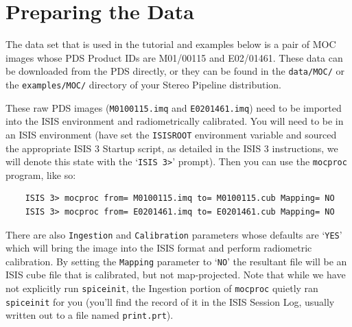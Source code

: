\section{Preparing the Data}

The data set that is used in the tutorial and examples below is a
pair of \ac{MOC} \citep{1992JGR....97.7699M,2001JGR...10623429M}
images whose \ac{PDS} Product IDs are M01/00115 and E02/01461.
These data can be downloaded from the PDS directly, or they can be
found in the \texttt{data/MOC/} or the \texttt{examples/MOC/}
directory of your Stereo Pipeline distribution.

These raw \ac{PDS} images (\texttt{M0100115.imq} and \texttt{E0201461.imq})
need to be imported into the \ac{ISIS} environment and radiometrically
calibrated.  You will need to be in an \ac{ISIS} environment (have
set the \texttt{ISISROOT} environment variable and sourced the
appropriate \ac{ISIS} 3 Startup script, as detailed in the \ac{ISIS}
3 instructions, we will denote this state with the `\texttt{ISIS
3>}' prompt).  Then you can use the \texttt{mocproc} program, like
so:

\begin{verbatim}
    ISIS 3> mocproc from= M0100115.imq to= M0100115.cub Mapping= NO
    ISIS 3> mocproc from= E0201461.imq to= E0201461.cub Mapping= NO
\end{verbatim}

There are also \texttt{Ingestion} and \texttt{Calibration} parameters
whose defaults are `\texttt{YES}' which will bring the image into
the \ac{ISIS} format and perform radiometric calibration.  By setting
the \texttt{Mapping} parameter to `\texttt{NO}' the resultant file
will be an \ac{ISIS} cube file that is calibrated, but not map-projected.
Note that while we have not explicitly run \texttt{spiceinit}, the
Ingestion portion of \texttt{mocproc} quietly ran \texttt{spiceinit}
for you (you'll find the record of it in the \ac{ISIS} Session Log,
usually written out to a file named \texttt{print.prt}).

